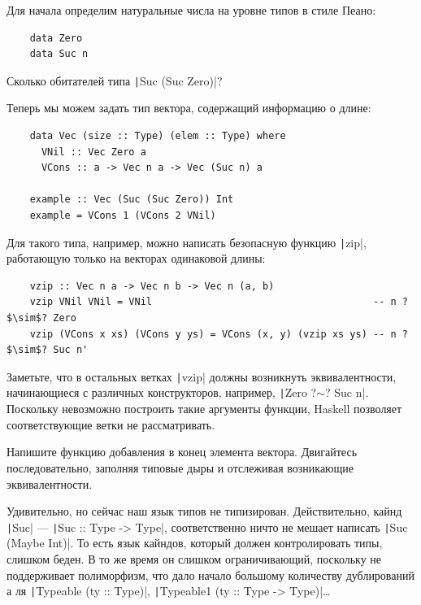 Для начала определим натуральные числа на уровне типов в стиле Пеано:
\begin{verbatim}
    data Zero
    data Suc n
\end{verbatim}

\begin{task}
    Сколько обитателей типа \texttt|Suc (Suc Zero)|?
\end{task}

Теперь мы можем задать тип вектора, содержащий информацию о длине:
\begin{verbatim}
    data Vec (size :: Type) (elem :: Type) where
      VNil :: Vec Zero a
      VCons :: a -> Vec n a -> Vec (Suc n) a

    example :: Vec (Suc (Suc Zero)) Int
    example = VCons 1 (VCons 2 VNil)
\end{verbatim}

Для такого типа, например, можно написать безопасную функцию \texttt|zip|, работающую только на векторах одинаковой длины:
\begin{verbatim}
    vzip :: Vec n a -> Vec n b -> Vec n (a, b)
    vzip VNil VNil = VNil                                      -- n ?$\sim$? Zero
    vzip (VCons x xs) (VCons y ys) = VCons (x, y) (vzip xs ys) -- n ?$\sim$? Suc n'
\end{verbatim}

Заметьте, что в остальных ветках \texttt|vzip| должны возникнуть эквивалентности, начинающиеся с различных конструкторов, например, \texttt|Zero ?$\sim$? Suc n|.
Поскольку невозможно построить такие аргументы функции, Haskell позволяет соответствующие ветки не рассматривать.

\begin{task}
    Напишите функцию добавления в конец элемента вектора.
    Двигайтесь последовательно, заполняя типовые дыры и отслеживая возникающие эквивалентности.
\end{task}

Удивительно, но сейчас наш язык типов не типизирован.
Действительно, кайнд \texttt|Suc| --- \texttt|Suc :: Type -> Type|, соответственно ничто не мешает написать \texttt|Suc (Maybe Int)|.
То есть язык кайндов, который должен контролировать типы, слишком беден.
В то же время он слишком ограничивающий, поскольку не поддерживает полиморфизм, что дало начало большому количеству дублирований а ля \texttt|Typeable (ty :: Type)|, \texttt|Typeable1 (ty :: Type -> Type)|\ldots

